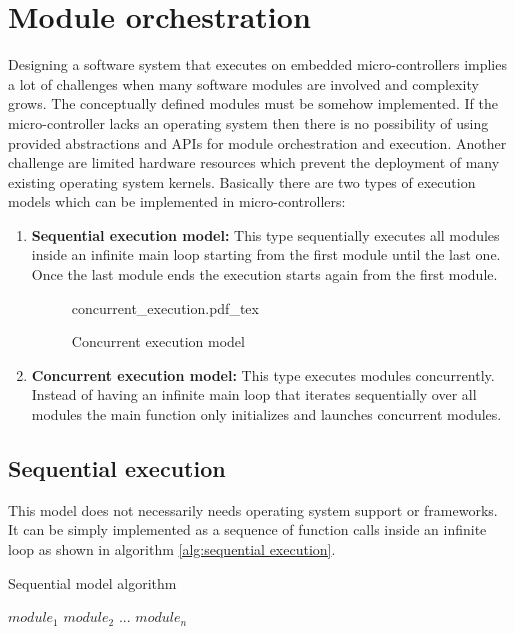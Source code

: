 \section{Module orchestration}
Designing a software system that executes on embedded micro-controllers implies a lot of challenges when many software modules are involved and complexity grows. The conceptually defined modules must be somehow implemented. If the micro-controller lacks an operating system then there is no possibility of using provided abstractions and APIs for module orchestration and execution. Another challenge are limited hardware resources which prevent the deployment of many existing operating system kernels. Basically there are two types of execution models which can be implemented in micro-controllers:

\begin{enumerate}

\begin{figure}[H]
    \centering
    {sequential_execution.pdf_tex}
    \caption{Sequential execution model}
\end{figure}

\item \textbf{Sequential execution model:} This type sequentially executes all modules inside an infinite main loop starting from the first module until the last one. Once the last module ends the execution starts again from the first module.

\begin{figure}[H]
\centering
{concurrent_execution.pdf_tex}
\caption{Concurrent execution model}
\end{figure}
\item \textbf{Concurrent execution model:} This type executes modules concurrently. Instead of having an infinite main loop that iterates sequentially over all modules the main function only initializes and launches concurrent modules.
\end{enumerate}

\subsection{Sequential execution}
This model does not necessarily needs operating system support or frameworks. It can be simply implemented as a sequence of function calls inside an infinite loop as shown in algorithm \ref{alg:sequential execution}.

\begin{algorithm}[H]
\caption{Sequential model algorithm}
\label{alg:sequential execution}
\begin{algorithmic}
\STATE $module_1$
\STATE $module_2$
\STATE $...$
\STATE $module_n$
\ENDWHILE
\end{algorithmic}
\end{algorithm}

